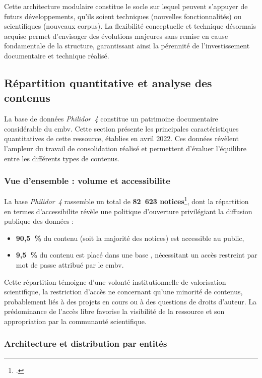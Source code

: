 Cette architecture modulaire constitue le socle sur lequel peuvent s'appuyer de futurs développements, qu'ils soient techniques (nouvelles fonctionnalités) ou scientifiques (nouveaux corpus). La flexibilité conceptuelle et technique désormais acquise permet d'envisager des évolutions majeures sans remise en cause fondamentale de la structure, garantissant ainsi la pérennité de l'investissement documentaire et technique réalisé.

\subsection{Répartition quantitative et analyse des contenus}

La base de données \textit{Philidor~4} constitue un patrimoine documentaire considérable du \gls{cmbv}. Cette section présente les principales caractéristiques quantitatives de cette ressource, établies en avril 2022. Ces données révèlent l'ampleur du travail de consolidation réalisé et permettent d'évaluer l'équilibre entre les différents types de contenus.

\subsubsection{Vue d'ensemble : volume et \gls{accessibilite}}

La base \textit{Philidor~4} rassemble un total de \textbf{82~623 notices}\footcite{laurentguilloRapportMigrationAnciennes2022}, dont la répartition en termes d'\gls{accessibilite} révèle une politique d'ouverture privilégiant la diffusion publique des données :

\begin{itemize}
	\item \textbf{90,5~\%} du contenu (soit la majorité des notices) est accessible au public,
	\item \textbf{9,5~\%} du contenu est placé dans une base , nécessitant un accès restreint par mot de passe attribué par le \gls{cmbv}.
\end{itemize}

Cette répartition témoigne d'une volonté institutionnelle de valorisation scientifique, la restriction d'accès ne concernant qu'une minorité de contenus, probablement liés à des projets en cours ou à des questions de droits d'auteur. La prédominance de l'accès libre favorise la visibilité de la ressource et son appropriation par la communauté scientifique.

\subsubsection{Architecture et distribution par entités}

